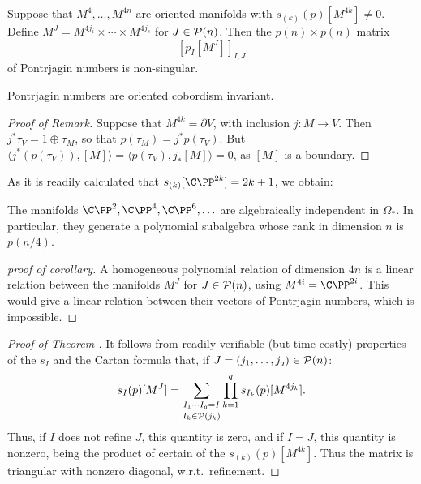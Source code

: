 \documentclass[11pt]{article}
\begin{document}
\begin{SignatureThmTalk}
%
%
%
\begin{thm*}[16.8]
Suppose that $M^4,\ldots,M^{4n}$ are oriented manifolds with $s_{(k)}(p)[M^{4k}]\neq0$. Define $M^J=M^{4j_i}\times\cdots\times M^{4j_s}$ for $J\in\mathcal{P}(n)$. Then the $p(n)\times p(n)$ matrix
\[\left[p_I[M^J]\right]_{I,J}\]
of Pontrjagin numbers is non-singular.
\end{thm*}
\begin{rmk*}
Pontrjagin numbers are oriented cobordism invariant.
\end{rmk*}
\begin{proof}[Proof of Remark]
Suppose that $M^{4k}=\partial V$, with inclusion $j:M\to V$. Then $j^*\tau_V=1\oplus\tau_M$, so that $p(\tau_M)=j^*p(\tau_V)$. But $\langle j^*(p(\tau_V)),[M]\rangle=\langle p(\tau_V),j_*[M]\rangle=0$, as $[M]$ is a boundary.
\end{proof}
\noindent As it is readily calculated that $s_{(k)}[\CP^{2k}]=2k+1$, we obtain:
\begin{cor*}
The manifolds $\CP^2,\CP^4,\CP^6,\ldots$ are algebraically independent in $\Omega_*$. In particular, they generate a polynomial subalgebra whose rank in dimension $n$ is $p(n/4)$.
\end{cor*}
\begin{proof}[proof of corollary]
A homogeneous polynomial relation of dimension $4n$ is a linear relation between the manifolds $M^J$ for $J\in\mathcal{P}(n)$, using $M^{4i}=\CP^{2i}$. This would give a linear relation between their vectors of Pontrjagin numbers, which is impossible.
\end{proof}
\begin{proof}[Proof of Theorem \rparen]\hfil
It follows from readily verifiable (but time-costly) properties of the $s_I$ and the Cartan formula that, if $J=(j_1,\ldots,j_q)\in\mathcal{P}(n)$:
\[s_I(p)[M^J]=\mathop{\sum_{I_1\cdots I_q=I}}_{I_k\in\mathcal{P}(j_k)}\prod_{k=1}^q s_{I_k}(p)[M^{4j_k}].\]
Thus, if $I$ does not refine $J$, this quantity is zero, and if $I=J$, this quantity is nonzero, being the product of certain of the $s_{(k)}(p)[M^{4k}]$. Thus the matrix is triangular with nonzero diagonal, w.r.t.\ refinement.
\end{proof}
\pagebreak

\end{SignatureThmTalk}
\end{document}
